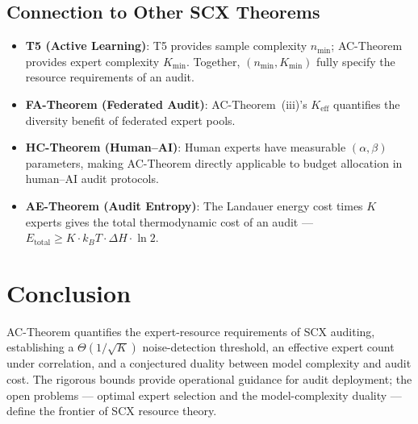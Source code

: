 \documentclass[12pt,a4paper]{article}
\begin{document}
\subsection{Connection to Other SCX Theorems}

\begin{itemize}
    \item \textbf{T5 (Active Learning)}: T5 provides sample complexity $n_{\min}$;
          AC-Theorem provides expert complexity $K_{\min}$.  Together,
          $(n_{\min},K_{\min})$ fully specify the resource requirements of an
          audit.
    \item \textbf{FA-Theorem (Federated Audit)}: AC-Theorem~(iii)'s $K_{\mathrm{eff}}$
          quantifies the diversity benefit of federated expert pools.
    \item \textbf{HC-Theorem (Human--AI)}: Human experts have measurable
          $(\alpha,\beta)$ parameters, making AC-Theorem directly applicable to
          budget allocation in human--AI audit protocols.
    \item \textbf{AE-Theorem (Audit Entropy)}: The Landauer energy cost times
          $K$ experts gives the total thermodynamic cost of an audit ---
          $E_{\mathrm{total}}\geq K\cdot k_B T\cdot\Delta H\cdot\ln2$.
\end{itemize}

\section{Conclusion}

AC-Theorem quantifies the expert-resource requirements of SCX auditing,
establishing a $\Theta(1/\sqrt{K})$ noise-detection threshold, an effective
expert count under correlation, and a conjectured duality between model
complexity and audit cost.  The rigorous bounds provide operational guidance
for audit deployment; the open problems --- optimal expert selection and the
model-complexity duality --- define the frontier of SCX resource theory.
\end{document}
